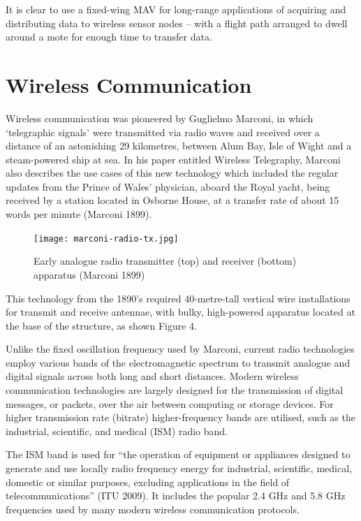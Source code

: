 It is clear to use a fixed-wing MAV for long-range applications of acquiring and distributing data to wireless sensor nodes – with a flight path arranged to dwell around a mote for enough time to transfer data.


\section{Wireless Communication}

Wireless communication was pioneered by Guglielmo Marconi, in which ‘telegraphic signals’ were transmitted via radio waves and received over a distance of an astonishing 29 kilometres, between Alum Bay, Isle of Wight and a steam-powered ship at sea. In his paper entitled Wireless Telegraphy, Marconi also describes the use cases of this new technology which included the regular updates from the Prince of Wales’ physician, aboard the Royal yacht, being received by a station located in Osborne House, at a transfer rate of about 15 words per minute (Marconi 1899).

\begin{figure}
    \centering
    \texttt{[image: marconi-radio-tx.jpg]}
    \caption{Early analogue radio transmitter (top) and receiver (bottom) apparatus (Marconi 1899)}
    \label{fig:marconi-radio-tx}
\end{figure}

This technology from the 1890’s required 40-metre-tall vertical wire installations for transmit and receive antennae, with bulky, high-powered apparatus located at the base of the structure, as shown Figure 4.

Unlike the fixed oscillation frequency used by Marconi, current radio technologies employ various bands of the electromagnetic spectrum to transmit analogue and digital signals across both long and short distances. Modern wireless communication technologies are largely designed for the transmission of digital messages, or packets, over the air between computing or storage devices. For higher transmission rate (bitrate) higher-frequency bands are utilised, such as the industrial, scientific, and medical (ISM) radio band.

The ISM band is used for “the operation of equipment or appliances designed to generate and use locally radio frequency energy for industrial, scientific, medical, domestic or similar purposes, excluding applications in the field of telecommunications” (ITU 2009). It includes the popular 2.4 GHz and 5.8 GHz frequencies used by many modern wireless communication protocols.

